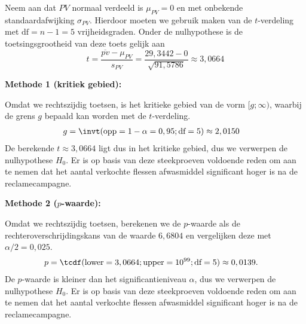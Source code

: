 {    Neem aan dat $PV$ normaal verdeeld is $\mu_{PV} = 0$ en met onbekende standaardafwijking $\sigma_{PV}$.  
    Hierdoor moeten we gebruik maken van de $t$-verdeling met $\text{df}=n-1 = 5$ vrijheidsgraden. 
    Onder de nulhypothese is de toetsingsgrootheid van deze toets gelijk aan
    \[
        t = \frac{\overline{pv} - \mu_{PV}}{s_{PV}} = \frac{29,3442 - 0}{\sqrt{91,5786}} \approx 3,0664
    \]

    {\bfseries Methode 1 (kritiek gebied):}
    
    Omdat we rechtszijdig toetsen, is het kritieke gebied van de vorm $[g; \infty)$, waarbij de grens $g$ bepaald kan worden met de $t$-verdeling.
    \begin{align*}
        g &= \invt(\text{opp}=1-\alpha = 0,95; \text{df}=5) \approx 2,0150
    \end{align*}
    De berekende $t \approx 3,0664$ ligt dus in het kritieke gebied, dus we verwerpen de nulhypothese $H_0$.
    Er is op basis van deze steekproeven voldoende reden om aan te nemen dat het aantal verkochte flessen afwasmiddel significant hoger is na de reclamecampagne.

    {\bfseries Methode 2 ($p$-waarde):}

    Omdat we rechtszijdig toetsen, berekenen we de $p$-waarde als de rechteroverschrijdingskans van de waarde $6,6804$ en vergelijken deze met $\alpha/2 = 0,025$.
    \begin{align*}
        p &= \tcdf(\text{lower}=3,0664; \text{upper}=10^{99}; \text{df}=5) \approx 0,0139.
    \end{align*}
    De $p$-waarde is kleiner dan het significantieniveau $\alpha$, dus we verwerpen de nulhypothese $H_0$.
    Er is op basis van deze steekproeven voldoende reden om aan te nemen dat het aantal verkochte flessen afwasmiddel significant hoger is na de reclamecampagne.
}
